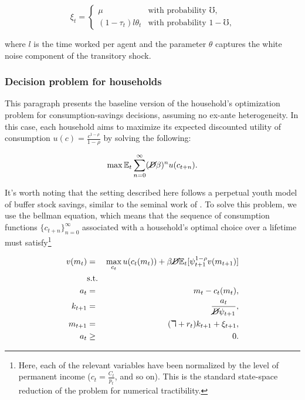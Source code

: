\begin{equation*}
\xi_t =
    \begin{cases}
        \mu & \text{with probability $\mho$,} \\
        (1-\tau_t) l \theta_t & \text{with probability $1-\mho$,}
    \end{cases}
\end{equation*}

\par where $l$ is the time worked per agent and the parameter $\theta$ captures the white noise component of the transitory shock.


\subsubsection{Decision problem for households}

\par This paragraph presents the baseline version of the household's optimization problem for consumption-savings decisions, assuming no ex-ante heterogeneity. In this case, each household aims to maximize its expected discounted utility of consumption $u(c) = \frac{c^{1-\rho}}{1-\rho}$ by solving the following:

$$ \max \mathbb{E}_t \sum_{n=0}^{\infty}(\cancel{D}\beta)^{n} u(c_{t+n}). $$

\par It's worth noting that the setting described here follows a perpetual youth model of buffer stock savings, similar to the seminal work of \cite{ks1998}. To solve this problem, we use the bellman equation, which means that the sequence of consumption functions $\{c_{t+n}\}^{\infty}_{n=0}$ associated with a household's optimal choice over a lifetime must satisfy\footnote{Here, each of the relevant variables have been normalized by the level of permanent income ($c_t = \frac{C_t}{p_t}$, and so on). This is the standard state-space reduction of the problem for numerical tractibility.} 

\begin{eqnarray*}
  v(m_t) &=& \max_{c_t} u(c_t(m_t)) + \beta \cancel{D} \mathbb{E}_{t}[\psi_{t+1}^{1-\rho}v(m_{t+1})] \\
  &\text{s.t.}& \\
  a_t &=& m_t - c_t(m_t), \\
  k_{t+1} &=& \frac{a_t}{\cancel{D}\psi_{t+1}}, \\
  m_{t+1} &=& (\daleth + r_t)k_{t+1} + \xi_{t+1}, \\
  a_t &\geq& 0.
\end{eqnarray*}




